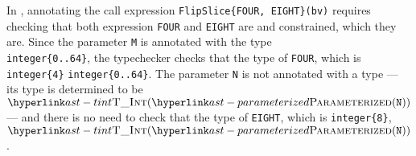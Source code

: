 In ,
annotating the call expression \verb|FlipSlice{FOUR, EIGHT}(bv)|
requires checking that both expression \verb|FOUR| and \verb|EIGHT| are \symbolicallyevaluable{}
and constrained, which they are.
Since the parameter \verb|M| is annotated with the type \\
\verb|integer{0..64}|,
the typechecker checks that the type of \verb|FOUR|, which is \verb|integer{4}| \typesatisfies{}
\verb|integer{0..64}|.
The parameter \verb|N| is not annotated with a type --- its type is
determined to be \\
$\TInt(\parameterized(\texttt{N}))$ --- and there is no need to check that
the type of \verb|EIGHT|, which is \verb|integer{8}|, \typesatisfies{} $\TInt(\parameterized(\texttt{N}))$.


